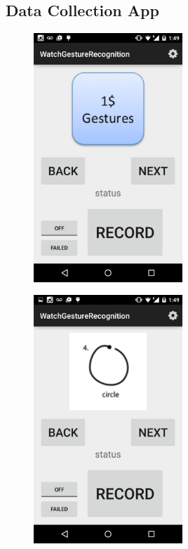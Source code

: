 \documentclass{report}
\begin{document}
\subsection{Data Collection App}

\begin{figure}
\includegraphics[width=0.5\textwidth]{app-1}
\end{figure}

\begin{figure}
\includegraphics[width=0.5\textwidth]{app-2}
\end{figure}
\end{document}
